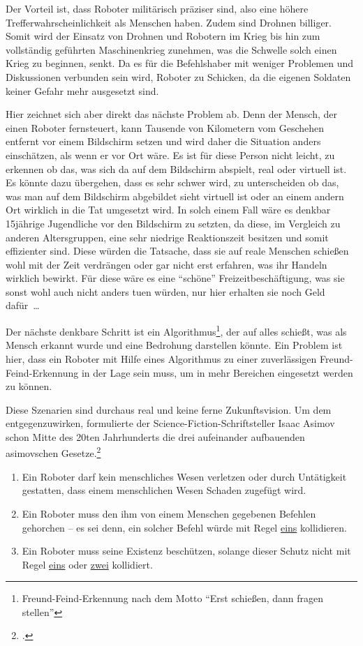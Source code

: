 Der Vorteil ist, dass Roboter militärisch präziser sind, also eine
höhere Trefferwahrscheinlichkeit als Menschen haben.
Zudem sind Drohnen billiger.
Somit wird der Einsatz von Drohnen und Robotern im Krieg
bis hin zum vollständig geführten Maschinenkrieg zunehmen, was
die Schwelle solch einen Krieg zu beginnen, senkt.
Da es für die Befehlshaber mit weniger Problemen
und Diskussionen verbunden sein wird, Roboter zu Schicken,
da die eigenen Soldaten keiner Gefahr mehr ausgesetzt sind.

\bigskip

Hier zeichnet sich aber direkt das nächste Problem ab.
Denn der Mensch, der einen Roboter fernsteuert,
kann Tausende von Kilometern vom Geschehen entfernt vor einem Bildschirm setzen
und wird daher die Situation anders einschätzen, als wenn er vor Ort wäre.
Es ist für diese Person nicht leicht, zu erkennen ob das, was sich da auf
dem Bildschirm abspielt, real oder virtuell ist.
Es könnte dazu übergehen, dass es sehr schwer wird, zu unterscheiden
ob das, was man auf dem Bildschirm abgebildet sieht virtuell ist
oder an einem andern Ort wirklich in die Tat umgesetzt wird.
In solch einem Fall wäre es denkbar 15jährige Jugendliche vor den Bildschirm zu setzten,
da diese, im Vergleich zu anderen Altersgruppen,
eine sehr niedrige Reaktionszeit besitzen und somit effizienter sind.
Diese würden die Tatsache, dass sie auf reale Menschen schießen wohl mit der Zeit verdrängen
oder gar nicht erst erfahren, was ihr Handeln wirklich bewirkt.
Für diese wäre es eine \enquote{schöne} Freizeitbeschäftigung,
was sie sonst wohl auch nicht anders tuen würden,
nur hier erhalten sie noch Geld dafür~\dots

Der nächste denkbare Schritt ist ein
Algorithmus\footnote{Freund-Feind-Erkennung nach dem Motto
\enquote{Erst schießen, dann fragen stellen}},
der auf alles schießt, was als Mensch erkannt wurde und eine Bedrohung darstellen könnte.
Ein Problem ist hier, dass ein Roboter mit Hilfe eines Algorithmus zu einer
zuverlässigen Freund-Feind-Erkennung in der Lage sein muss,
um in mehr Bereichen eingesetzt werden zu können.

Diese Szenarien sind durchaus real und keine ferne Zukunftsvision. Um
dem entgegenzuwirken, formulierte der Science-Fiction-Schriftsteller
Isaac Asimov schon Mitte des 20ten Jahrhunderts die drei aufeinander
aufbauenden asimovschen Gesetze.\footcite{Robotergesetze:Asimov}

\begin{enumerate}
	\item Ein Roboter darf kein menschliches Wesen verletzen oder durch Untätigkeit gestatten,
		dass einem menschlichen Wesen Schaden zugefügt wird.
		\label{Robotergesetze:Asimov:Eins}
	\item Ein Roboter muss den ihm von einem Menschen gegebenen Befehlen gehorchen --
		es sei denn, ein solcher Befehl würde mit Regel
		\hyperref[Robotergesetze:Asimov:Eins]{eins} kollidieren.
		\label{Robotergesetze:Asimov:Zwei}
	\item Ein Roboter muss seine Existenz beschützen, solange dieser Schutz nicht mit Regel
		\hyperref[Robotergesetze:Asimov:Eins]{eins} oder
		\hyperref[Robotergesetze:Asimov:Zwei]{zwei} kollidiert.
\end{enumerate}

